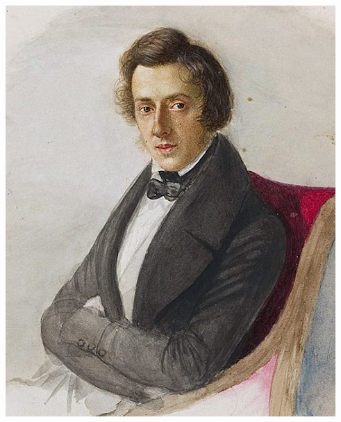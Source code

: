\documentclass[aspectratio=43,x11names]{beamer}
\begin{document}
\begin{frame}[fragile]
\begin{minipage}{0.45\textwidth}
\begin{center}
\includegraphics[width=\textwidth, keepaspectratio]{images/chopin} 
\end{center}
\end{minipage}
\end{frame}

\end{document}
